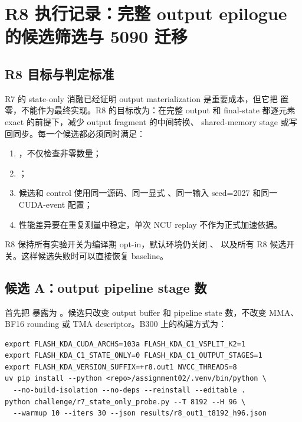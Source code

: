\section{R8 执行记录：完整 output epilogue 的候选筛选与 5090 迁移}

\subsection{R8 目标与判定标准}

R7 的 state-only 消融已经证明 output materialization 是重要成本，但它把
 置零，不能作为最终实现。R8 的目标改为：在完整 output 和
final-state 都逐元素 exact 的前提下，减少 output fragment 的中间转换、
shared-memory stage 或写回同步。每一个候选都必须同时满足：

\begin{enumerate}
  \item {}，不仅检查非零数量；
  \item {}；
  \item 候选和 control 使用同一源码、同一显式 、同一输入
        seed=2027 和同一 CUDA-event 配置；
  \item 性能差异要在重复测量中稳定，单次 NCU replay 不作为正式加速依据。
\end{enumerate}

R8 保持所有实验开关为编译期 opt-in，默认环境仍关闭
、
以及所有 R8 候选开关。这样候选失败时可以直接恢复 baseline。

\subsection{候选 A：output pipeline stage 数}

首先把  暴露为
。候选只改变 output buffer
和 pipeline state 数，不改变 MMA、BF16 rounding 或 TMA descriptor。B300
上的构建方式为：

\begin{lstlisting}
export FLASH_KDA_CUDA_ARCHS=103a FLASH_KDA_C1_VSPLIT_K2=1
export FLASH_KDA_C1_STATE_ONLY=0 FLASH_KDA_C1_OUTPUT_STAGES=1
export FLASH_KDA_VERSION_SUFFIX=+r8.out1 NVCC_THREADS=8
uv pip install --python <repo>/assignment02/.venv/bin/python \
  --no-build-isolation --no-deps --reinstall --editable .
python challenge/r7_state_only_probe.py --T 8192 --H 96 \
  --warmup 10 --iters 30 --json results/r8_out1_t8192_h96.json
\end{lstlisting}

